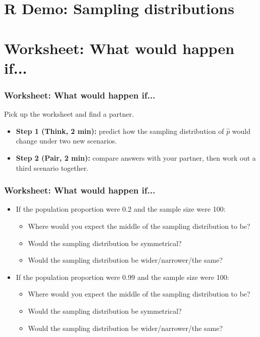 \documentclass[t,compress,mathserif]{beamer}
\begin{document}
\section{R Demo: Sampling distributions}



\section{Worksheet: What would happen if...}

\begin{frame}
\frametitle{Worksheet: What would happen if...}

Pick up the worksheet and find a partner.

\begin{itemize}
    \item \textbf{Step 1 (Think, 2 min):} predict how the sampling distribution of $\hat p$ would change under two new scenarios.
    \item \textbf{Step 2 (Pair, 2 min):} compare answers with your partner, then work out a third scenario together.
\end{itemize}

\end{frame}


\begin{frame}
    \frametitle{Worksheet: What would happen if...}

    \begin{itemize}

        \item If the population proportion were 0.2 and the sample size were 100:
        \begin{itemize}
            \item Where would you expect the middle of the sampling distribution to be?
            \item Would the sampling distribution be symmetrical?
            \item Would the sampling distribution be wider/narrower/the same?
        \end{itemize}
        \item If the population proportion were 0.99 and the sample size were 100:
        \begin{itemize}
            \item Where would you expect the middle of the sampling distribution to be?
            \item Would the sampling distribution be symmetrical?
            \item Would the sampling distribution be wider/narrower/the same?
        \end{itemize}
 
    \end{itemize}

\end{frame}
\end{document}
